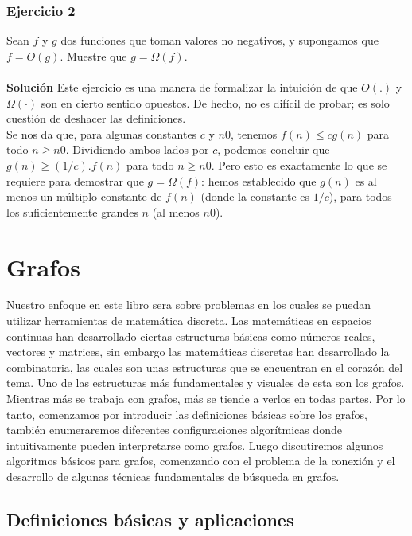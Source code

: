 \documentclass[a4paper, 12pt]{book}
\theoremstyle{dotless}
\begin{document}
\subsection*{Ejercicio 2} 

Sean $f$ y $g$ dos funciones que toman valores no negativos, y supongamos que $f=O(g)$. Muestre que $g=\Omega(f)$.\\\\
\textbf{Solución} Este ejercicio es una manera de formalizar la intuición de que $O(.)$ y $\Omega(·)$ son en cierto sentido opuestos. De hecho, no es difícil de probar; es solo cuestión de deshacer las definiciones.\\
Se nos da que, para algunas constantes $c$ y $n0$, tenemos $f(n)≤cg(n)$ para todo $n≥n0$. Dividiendo ambos lados por $c$, podemos concluir que $g(n)≥(1/c).f(n)$ para todo $n≥n0$. Pero esto es exactamente lo que se requiere para demostrar que $g=\Omega(f)$: hemos establecido que $g(n)$ es al menos un múltiplo constante de $f(n)$ (donde la constante es $1/c$), para todos los suficientemente grandes $n$ (al menos $n0$).\\

\chapter{Grafos}
\label{ch:grafos}

Nuestro enfoque en este libro sera sobre problemas en los cuales se puedan utilizar herramientas de matemática discreta. Las matemáticas en espacios continuas han desarrollado ciertas estructuras básicas como números reales, vectores y matrices, sin embargo las matemáticas discretas han desarrollado la combinatoria, las cuales son unas estructuras que se encuentran en el corazón del tema. Uno de las estructuras más fundamentales y visuales de esta son los grafos. \\

Mientras más se trabaja con grafos, más se tiende a verlos en todas partes.
Por lo tanto, comenzamos por introducir las definiciones básicas sobre los grafos, también enumeraremos diferentes configuraciones algorítmicas donde intuitivamente pueden interpretarse como grafos. Luego discutiremos algunos algoritmos básicos para grafos, comenzando
con el problema de la conexión y el desarrollo de algunas técnicas fundamentales de búsqueda en grafos.\\

\section{Definiciones básicas y aplicaciones}
\end{document}
